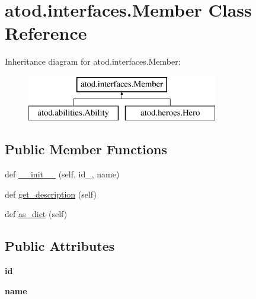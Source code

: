 \hypertarget{classatod_1_1interfaces_1_1_member}{}\section{atod.\+interfaces.\+Member Class Reference}
\label{classatod_1_1interfaces_1_1_member}
Inheritance diagram for atod.\+interfaces.\+Member\+:\begin{figure}[H]
\begin{center}
\leavevmode
\includegraphics[height=2.000000cm]{classatod_1_1interfaces_1_1_member}
\end{center}
\end{figure}
\subsection*{Public Member Functions}
\begin{DoxyCompactItemize}
\item 
def \hyperlink{classatod_1_1interfaces_1_1_member_a7557bab11a65df8d39570804c9164d4f}{\+\_\+\+\_\+init\+\_\+\+\_\+} (self, id\+\_\+, name)
\item 
def \hyperlink{classatod_1_1interfaces_1_1_member_a00249f19c666de37fb983c717a994a49}{get\+\_\+description} (self)
\item 
def \hyperlink{classatod_1_1interfaces_1_1_member_a2b04b9db80fee2d437a8f989378d8dbd}{as\+\_\+dict} (self)
\end{DoxyCompactItemize}
\subsection*{Public Attributes}
\begin{DoxyCompactItemize}
\item 
{\bfseries id}\hypertarget{classatod_1_1interfaces_1_1_member_a14b6a3cf57d655d51c6495109ddde26b}{}\label{classatod_1_1interfaces_1_1_member_a14b6a3cf57d655d51c6495109ddde26b}

\item 
{\bfseries name}\hypertarget{classatod_1_1interfaces_1_1_member_acfbfe3c22092108af35c6961d7962e97}{}\label{classatod_1_1interfaces_1_1_member_acfbfe3c22092108af35c6961d7962e97}

\end{DoxyCompactItemize}
